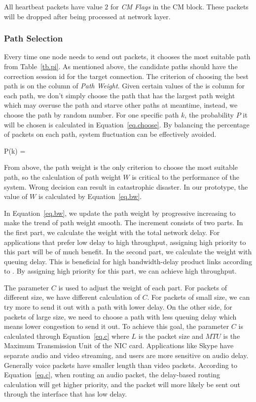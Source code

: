 All heartbeat packets have value $2$ for \emph{CM Flags} in the CM block. These packets will be dropped after being processed at network layer.


\subsubsection{Path Selection}
\label{sec:selection}

Every time one node needs to send out packets, it chooses the most suitable path from Table~\ref{tb.pi}. As mentioned above, the candidate paths should have the correction session id for the target connection. The criterion of choosing the best path is on the column of \emph{Path Weight}. Given certain values of the is column for each path, we don\textquoteright t simply choose the path that has the largest path weight which may overuse the path and starve other paths at meantime, instead, we choose the path by random number. For one specific path $k$, the probability $P$ it will be chosen is calculated in Equation~\ref{eq.choose}. By balancing the percentage of packets on each path, system fluctuation can be effectively avoided.

\be
\label{eq.choose}
P(k) = 
\ee

From above, the path weight is the only criterion to choose the most suitable path, so the calculation of path weight $W$ is critical to the performance of the system. Wrong decision can result in catastrophic disaster. In our prototype, the value of $W$ is calculated by Equation~\ref{eq.bw}. 

In Equation~\ref{eq.bw}, we update the path weight by progressive increasing to make the trend of path weight smooth. The increment consists of two parts. In the first part, we calculate the weight with the total network delay. For applications that prefer low delay to high throughput, assigning high priority to this part will be of much benefit. In the second part, we calculate the weight with queuing delay. This is beneficial for high bandwidth-delay product links according to \cite{mptcp}. By assigning high priority for this part, we can achieve high throughput. 

The parameter $C$ is used to adjust the weight of each part. For packets of different size, we have different calculation of $C$. For packets of small size, we can try more to send it out with a path with lower delay. On the other side, for packets of large size, we need to choose a path with less queuing delay which means lower congestion to send it out. To achieve this goal, the parameter $C$ is calculated through Equation~\ref{eq.c} where $L$ is the packet size and $MTU$ is the Maximum Transmission Unit of the NIC card. Applications like Skype have separate audio and video streaming, and users are more sensitive on audio delay. Generally voice packets have smaller length than video packets. According to Equation~\ref{eq.c}, when routing an audio packet, the delay-based routing calculation will get higher priority, and the packet will more likely be sent out through the interface that has low delay.


